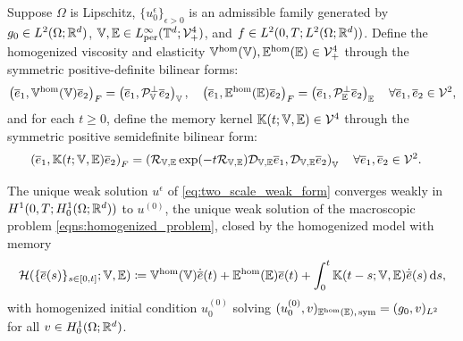 \documentclass[3p, 12pt, preprint]{elsarticle}
\begin{document}
\begin{theorem} \label{thm:viscoelastic_homogenization}
Suppose $\Omega$ is Lipschitz, $\{u_0^\epsilon\}_{\epsilon>0}$ is an admissible family generated by $g_0\in L^2(\Omega;\mathbb{R}^d)$, $\mathbb{V},\mathbb{E}\in L^{\infty}_{\mathrm{per}}(\mathbb{T}^d;{\mathcal{V}}^4_{+})$, and $f \in L^2(0,T; L^2(\Omega; \mathbb{R}^d))$. Define the homogenized viscosity and elasticity $\mathbb{V}^{\mathrm{hom}}(\mathbb{V}), \mathbb{E}^{\mathrm{hom}}(\mathbb{E})\in{\mathcal{V}}^4_{+}$ through the symmetric positive-definite bilinear forms:
\begin{align}\label{eq:homogenized_tensors}
    \left(\overline{e}_1,\mathbb{V}^{\mathrm{hom}}(\mathbb{V})\overline{e}_2\right)_F = \left(\overline{e}_1, {\mathcal{P}}_{\mathbb{V}}^{\perp} \overline{e}_2\right)_{\mathbb{V}}, \quad \left(\overline{e}_1, \mathbb{E}^{\mathrm{hom}}(\mathbb{E}) \overline{e}_2\right)_F = \left(\overline{e}_1, {\mathcal{P}}_{\mathbb{E}}^{\perp} \overline{e}_2\right)_{\mathbb{E}}\quad \forall \overline{e}_1, \overline{e}_2 \in {\mathcal{V}}^2,
\end{align}
and for each $t\ge0$, define the memory kernel $\mathbb{K}(t;\mathbb{V},\mathbb{E})\in {\mathcal{V}}^4$ through the symmetric positive semidefinite bilinear form:
\begin{align}\label{eq:memory_kernel}
    \left(\overline{e}_1, \mathbb{K}(t; \mathbb{V}, \mathbb{E}) \overline{e}_2\right)_F &= \left({\mathcal{R}}_{\mathbb{V},\mathbb{E}}\exp(-t{\mathcal{R}}_{\mathbb{V},\mathbb{E}}){\mathcal{D}}_{\mathbb{V},\mathbb{E}} \overline{e}_1, {\mathcal{D}}_{\mathbb{V},\mathbb{E}} \overline{e}_2\right)_{\mathbb{V}}\quad\forall \overline{e}_1, \overline{e}_2 \in {\mathcal{V}}^2.
\end{align}

The unique weak solution $u^{\epsilon}$ of \cref{eq:two_scale_weak_form} converges weakly in $H^1(0,T; H^1_0(\Omega; \mathbb{R}^d))$ to $u^{(0)}$, the unique weak solution of the macroscopic problem \cref{eqns:homogenized_problem}, closed by the homogenized model with memory
\begin{align}\label{eq:homogenized_model_identified}
    {\mathcal{H}}(\{\overline{e}(s)\}_{s\in[0, t]};\mathbb{V}, \mathbb{E}) \coloneqq \mathbb{V}^{\mathrm{hom}}(\mathbb{V}) \dot{\overline{e}}(t) + \mathbb{E}^{\mathrm{hom}}(\mathbb{E})\overline{e}(t) + \int_{0}^{t} \mathbb{K}(t-s; \mathbb{V}, \mathbb{E})\dot{\overline{e}}(s) \, \mathrm{d}s,
\end{align}
with homogenized initial condition $u_0^{(0)}$ solving $(u^{(0)}_0,v)_{\mathbb{E}^{\rm hom}(\mathbb{E}),\, \mathrm{sym}}=(g_0,v)_{L^2}$ for all $v\in H_0^1(\Omega;\mathbb{R}^d)$.
\end{theorem}
\end{document}
